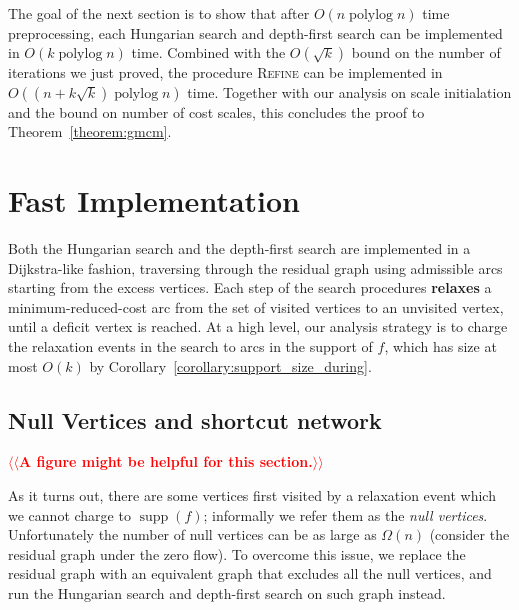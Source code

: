 \documentclass[11pt]{article}
\makeatletter
\def\polylog{\mathop{\mathrm{polylog}}}
\def\supp{\operatorname{supp}}
\theoremstyle{plain}
\numberwithin{figure}{section}
\def\EMPH#1{\textbf{\boldmath #1}}
\def\n@te#1{\textsf{\boldmath \textbf{$\langle\!\langle$#1$\rangle\!\rangle$}}\leavevmode}
\def\note#1{\textcolor{red}{\n@te{#1}}}
\makeatother
\begin{document}

The goal of the next section is to show that after $O(n \polylog n)$ time preprocessing, each Hungarian search and depth-first search can be implemented in $O(k \polylog n)$ time.
%
Combined with the $O(\sqrt{k})$ bound on the number of iterations we just proved, the procedure \textsc{Refine} can be implemented in $O((n+k\sqrt{k}) \polylog n)$ time.  Together with our analysis on scale initialation and the bound on number of cost scales, this concludes the proof to Theorem~\ref{theorem:gmcm}.


\section{Fast Implementation}

Both the Hungarian search and the depth-first search are implemented in a Dijkstra-like fashion, traversing through the residual graph using admissible arcs starting from the excess vertices.
Each step of the search procedures \EMPH{relaxes} a minimum-reduced-cost arc from the set of visited vertices to an unvisited vertex, until a deficit vertex is reached.
%
At a high level, our analysis strategy is to charge the relaxation events in the search to arcs in the support of $f$, which has size at most $O(k)$ by Corollary~\ref{corollary:support_size_during}.

\subsection{Null Vertices and shortcut network}

\note{A figure might be helpful for this section.}

As it turns out, there are some vertices first visited by a relaxation event which we cannot charge to $\supp(f)$; informally we refer them as the \emph{null vertices}.
Unfortunately the number of null vertices can be as large as $\Omega(n)$
(consider the residual graph under the zero flow).
%
To overcome this issue, we replace the residual graph with an equivalent graph that excludes all the null vertices,
and run the Hungarian search and depth-first search on such graph instead.
\end{document}
